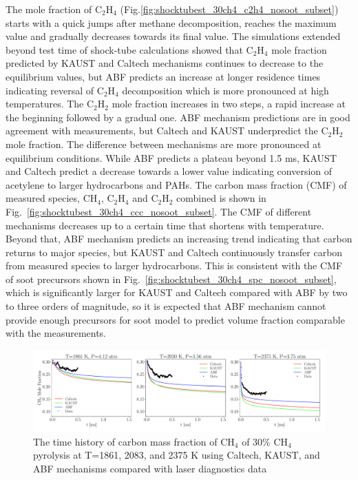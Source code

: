  The mole fraction of $\mathrm{C_2H_4}$ (Fig.\ref{fig:shocktubest_30ch4_c2h4_nosoot_subset}) starts with a quick jumps after methane decomposition, reaches the maximum value and gradually decreases towards its final value. The simulations extended beyond test time of shock-tube calculations showed that $\mathrm{C_2H_4}$ mole fraction predicted by KAUST and Caltech mechanisms continues to decrease to the equilibrium values, but ABF predicts an increase at longer residence times indicating reversal of $\mathrm{C_2H_4}$ decomposition which is more pronounced at high temperatures. The $\mathrm{C_2H_2}$ mole fraction increases in two steps, a rapid increase at the beginning followed by a gradual one. ABF mechanism predictions are in good agreement with measurements, but Caltech and KAUST underpredict the $\mathrm{C_2H_2}$ mole fraction. The difference between mechanisms are more pronounced at equilibrium conditions. While ABF predicts a plateau beyond 1.5 ms, KAUST and Caltech predict a decrease towards a lower value indicating conversion of acetylene to larger hydrocarbons and PAHs. The carbon mass fraction (CMF) of measured species, $\mathrm{CH_4}$, $\mathrm{C_2H_4}$ and $\mathrm{C_2H_2}$ combined is shown in Fig.~\ref{fig:shocktubest_30ch4_ccc_nosoot_subset}. The CMF of different mechanisms decreases up to a certain time that shortens with temperature. Beyond that, ABF mechanism predicts an increasing trend indicating that carbon returns to major species, but KAUST and Caltech continuously transfer carbon from measured species to larger hydrocarbons. This is consistent with the CMF of soot precursors shown in Fig.~\ref{fig:shocktubest_30ch4_spc_nosoot_subset}, which is significantly larger for KAUST and Caltech compared with ABF by two to three orders of magnitude, so it is expected that ABF mechanism cannot provide enough precursors for soot model to predict volume fraction comparable with the measurements.  
 \begin{figure}[H]
 	\centering
 	\includegraphics[width=1\textwidth]{Figures/Results/Shocktube/Stanford/june/30CH4_CH4_mechs_nosoot_subset.pdf}
 	\caption{The time history of carbon mass fraction of $\mathrm{CH_4}$ of 30\% $\mathrm{CH_4}$ pyrolysis at T=1861, 2083, and 2375 K using Caltech, KAUST, and ABF mechanisms compared with laser diagnostics data}
 	\label{fig:shocktubest_30ch4_ch4_nosoot_subset} 
 \end{figure}

